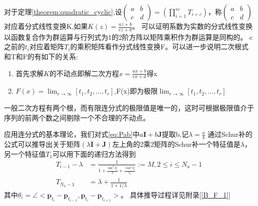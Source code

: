 \begin{remark}
对于定理\ref{theorem:quadratic_cyclic},设$(\begin{matrix}a&b\\c&d\end{matrix})=(\prod_{i=1}^{rc} T_{i+c})$，称$(\begin{matrix}a&b\\c&d\end{matrix})$对应着分式线性变换K,如果$K(z)=\frac{az+b}{cz+d}$。
可以证明系数为实数的分式线性变换以函数复合作为群运算与行列式为1的2阶方阵以矩阵乘积作为群运算是同构的。
c之前的$t_i$对应着矩阵$T_i$的乘积矩阵看作分式线性变换F。可以进一步说明二次根式和T和F的有如下的关系:
\begin{enumerate}
  \item 首先求解$K$的不动点即解二次方程$x=\frac{ax+b}{cx+d}$得x
  \item $F(x)=\lim_{r\to \infty}[t_1,t_2,\dots,t_r]$,F(x)即为极限$\lim_{r\to \infty}[t_1,t_2,\dots,t_r]$
\end{enumerate}
一般二次方程有两个根，而有限连分式的极限值是唯一的，这时可根据极限值介于序列的前两个数之间剔除一个不合理的不动点。
\end{remark}
应用连分式的基本理论，我们对式\ref{eq:Pab}中$a\bm{I}+b\bm{J}$提取b,记$\lambda=\frac{a}{b}$
通过Schur补的公式可以推导出关于矩阵$(\lambda\bm{I}+\bm{J})$左上角的2乘2矩阵的Schur补一个特征值是$\lambda$，另一个特征值$T_1$可以用下面的递归方法得到
\begin{equation}\label{eq:recursive_efim}
\begin{split}
T_{i-1}-\lambda & =\frac{1}{1+\frac{\sin^2\theta_i}{\lambda}+\frac{\cos^2\theta_i}{T_i}}:=M,2\leq i\leq N_a-1\\
T_{N_a-1} & = \lambda+\frac{1}{1+1/\lambda}
\end{split}
\end{equation}
其中$\theta_i=\angle <\bm{p}_{t_i}-\bm{p}_{t_{i-1}},\bm{p}_{t_i}-\bm{p}_{t_{i+1}}>$。
具体推导过程详见附录[\ref{B_F_1}]

